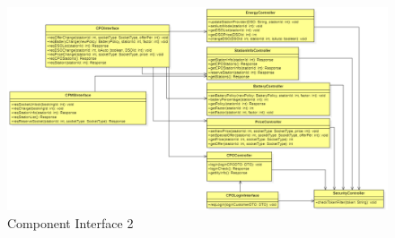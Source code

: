 \begin{figure}[H]
    \begin{center}
        \includegraphics[width=\textwidth]{img/ComponentInterface2.PNG}
        \caption{Component Interface 2}\label{component_interface2}
    \end{center}
\end{figure}

